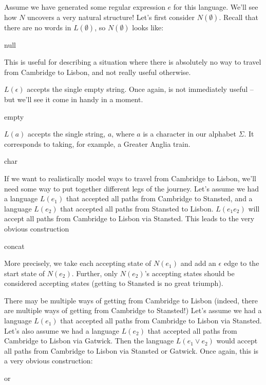 Assume we have generated some regular expression $e$ for this language. We'll see how $N$ uncovers a very natural structure! Let's first consider $N(\emptyset)$. Recall that there are no words in $L(\emptyset)$, so $N(\emptyset)$ looks like:

\begin{center}
{null}
\end{center}

This is useful for describing a situation where there is absolutely no way to travel from Cambridge to Lisbon, and not really useful otherwise.

$L(\epsilon)$ accepts the single empty string. Once again, is not immediately useful -- but we'll see it come in handy in a moment.

\begin{center}
{empty}
\end{center}

$L(a)$ accepts the single string, $a$, where $a$ is a character in our alphabet $\Sigma$. It corresponds to taking, for example, a Greater Anglia train.

\begin{center}
{char}
\end{center}

If we want to realistically model ways to travel from Cambridge to Lisbon, we'll need some way to put together different legs of the journey. Let's assume we had a language $L(e_1)$ that accepted all paths from Cambridge to Stansted, and a language $L(e_2)$ that accepted all paths from Stansted to Lisbon. $L(e_1 e_2)$ will accept all paths from Cambridge to Lisbon via Stansted. This leads to the very obvious construction

\begin{center}
    {concat}
\end{center}

More precisely, we take each accepting state of $N(e_1)$ and add an $\epsilon$ edge to the start state of $N(e_2)$. Further, only $N(e_2)$'s accepting states should be considered accepting states (getting to Stansted is no great triumph).  

There may be multiple ways of getting from Cambridge to Lisbon (indeed, there are multiple ways of getting from Cambridge to Stansted!) Let's assume we had a language $L(e_1)$ that accepted all paths from Cambridge to Lisbon via Stansted. Let's also assume we had a language $L(e_2)$ that accepted all paths from Cambridge to Lisbon via Gatwick. Then the language $L(e_1 \lor e_2)$ would accept all paths from Cambridge to Lisbon via Stansted or Gatwick. Once again, this is a very obvious construction:
\begin{center}
{or}
\end{center}

